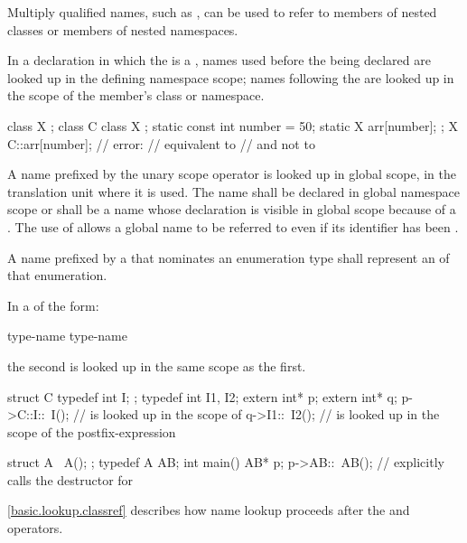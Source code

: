 \pnum
\begin{note}
Multiply qualified names, such as , can
be used to refer to members of nested classes or
members of nested namespaces.
\end{note}

\pnum
In a declaration in which the  is a
, names used before the 
being declared are looked up in the defining namespace scope; names
following the  are looked up in the scope of the
member's class or namespace.
\begin{example}
\begin{codeblock}
class X { };
class C {
  class X { };
  static const int number = 50;
  static X arr[number];
};
X C::arr[number];   // error:
                    // equivalent to  
                    // and not to  
\end{codeblock}
\end{example}

\pnum
{}%
%
A name prefixed by the unary scope operator \tcode{::}
is looked up in global scope, in the translation unit where it is used.
The name shall be declared in global namespace scope or shall be a name
whose declaration is visible in global scope because of a
. The use of \tcode{::}
allows a global name to be referred to even if its identifier has been
.

\pnum
A name prefixed by a  that
nominates an enumeration type shall represent an 
of that enumeration.

\pnum
In a  of the form:

\begin{ncbnf}
 type-name \terminal{::} \terminal{\~} type-name
\end{ncbnf}
the second  is looked up in the same scope as the first.
\begin{example}
\begin{codeblock}
struct C {
  typedef int I;
};
typedef int I1, I2;
extern int* p;
extern int* q;
p->C::I::~I();      //  is looked up in the scope of 
q->I1::~I2();       //  is looked up in the scope of the postfix-expression

struct A {
  ~A();
};
typedef A AB;
int main() {
  AB* p;
  p->AB::~AB();     // explicitly calls the destructor for 
}
\end{codeblock}
\end{example}
\begin{note}
\ref{basic.lookup.classref} describes how name
lookup proceeds after the  and \tcode{->} operators.
\end{note}

